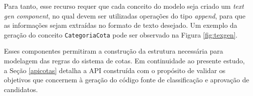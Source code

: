 Para tanto, esse recurso requer que cada conceito do modelo seja criado um \textit{text gen component}, no qual devem ser utilizadas operações do tipo \textit{append}, para que as informações sejam extraídas no formato de texto desejado. Um exemplo da geração do conceito \texttt{CategoriaCota} pode ser observado na Figura \ref{fig:texgen}.




Esses componentes permitiram a construção da estrutura necessária para modelagem das regras do sistema de cotas. Em continuidade ao presente estudo, a Seção \ref{apicotas} detalha a \gls{API} construída com o propósito de validar os objetivos que concernem à geração do código fonte de classificação e aprovação de candidatos.

\newpage